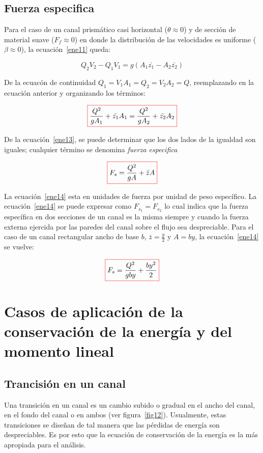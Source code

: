 \documentclass[11pt, oneside]{article}
\begin{document}
\subsection{Fuerza especifica}
Para el caso de un canal prism\'atico casi horizontal ($\theta \approx 0$) y de secci\'on de material suave ($F_f \approx 0$) en donde la distribuci\'on de las velocidades es uniforme ($\beta \approx 0$), la ecuaci\'on~\ref{ene11} queda:

\begin{equation}
Q_2 V_2 - Q_1 V_1 = g \left( A_1 \bar{z_1} - A_2 \bar{z_2} \right)
\label{ene12}
\end{equation}

De la ecuac\'on de continuidad $Q_1 = V_1 A_1 = Q_2 = V_2 A_2 = Q$, reemplazando en la ecuaci\'on anterior y organizando los t\'erminos:

\begin{equation}
\color{red}\boxed{\color{black}\frac{Q^2}{g A_1} + \bar{z_1}A_1 = \frac{Q^2}{g A_2} + \bar{z_2}A_2 }
\label{ene13}
\end{equation}

De la ecuaci\'on~\ref{ene13}, se puede determinar que los dos lados de la igualdad son iguales; cualquier t\'ermino se denomina \emph{fuerza especifica}

\begin{equation}
\color{red}\boxed{\color{black} F_s = \frac{Q^2}{g A} + \bar{z}A  }
\label{ene14}
\end{equation}

La ecuaci\'on~\ref{ene14} esta en unidades de fuerza por unidad de peso espec\'ifico. La ecuaci\'on~\ref{ene14} se puede expresar como $F_{s_1} = F_{s_2}$ lo cual indica que la fuerza espec\'ifica en dos secciones de un canal es la misma siempre y cuando la fuerza externa ejercida por las paredes del canal sobre el flujo sea despreciable. Para el caso de un canal rectangular ancho de base $b$, $\bar{z} = \frac{y}{2}$ y $A=by$, la ecuaci\'on~\ref{ene14} se vuelve:

\begin{equation}
\color{red}\boxed{\color{black} F_s = \frac{Q^2}{g by} + \frac{by^2}{2} }
\label{ene15}
\end{equation}

\section{Casos de aplicaci\'on de la conservaci\'on de la energ\'ia y del momento lineal}
\subsection{Trancisi\'on en un canal}
Una transici\'on en un canal es un cambio subido o gradual en el ancho del canal, en el fondo del canal o en ambos (ver figura~\ref{fig12}). Usualmente, estas transiciones se diseñan de tal manera que las p\'erdidas de energ\'ia son despreciables. Es por esto que la ecuaci\'on de conservaci\'on de la energ\'ia es la m\'as apropiada para el an\'alisis. 
\end{document}
